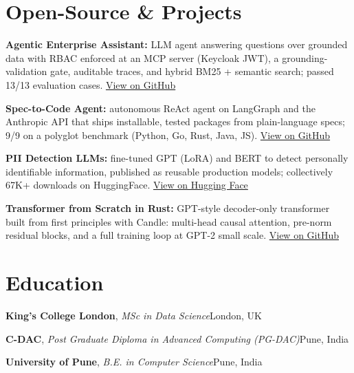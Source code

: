 \documentclass[10pt,a4paper]{article}
\begin{document}
\section{Open-Source \& Projects}
\begin{tight}
  \item \textbf{Agentic Enterprise Assistant:} LLM agent answering questions over grounded data with RBAC enforced at an MCP server (Keycloak JWT), a grounding-validation gate, auditable traces, and hybrid BM25 + semantic search; passed 13/13 evaluation cases. \href{https://github.com/abhijeetscode/Agentic-Enterprise-Assistant}{View on GitHub}
  \item \textbf{Spec-to-Code Agent:} autonomous ReAct agent on LangGraph and the Anthropic API that ships installable, tested packages from plain-language specs; 9/9 on a polyglot benchmark (Python, Go, Rust, Java, JS). \href{https://github.com/abhijeetscode/Spec-to-Code-Agent}{View on GitHub}
  \item \textbf{PII Detection LLMs:} fine-tuned GPT (LoRA) and BERT to detect personally identifiable information, published as reusable production models; collectively 67K+ downloads on HuggingFace. \href{https://huggingface.co/ab-ai/pii_model}{View on Hugging Face}
  \item \textbf{Transformer from Scratch in Rust:} GPT-style decoder-only transformer built from first principles with Candle: multi-head causal attention, pre-norm residual blocks, and a full training loop at GPT-2 small scale. \href{https://github.com/abhijeetscode/transformer-rust}{View on GitHub}
\end{tight}

\section{Education}
{\color{company}\bfseries King's College London}, {\itshape MSc in Data Science}\hfill {\color{muted}London, UK}\par\vspace{2pt}
{\color{company}\bfseries C-DAC}, {\itshape Post Graduate Diploma in Advanced Computing (PG-DAC)}\hfill {\color{muted}Pune, India}\par\vspace{2pt}
{\color{company}\bfseries University of Pune}, {\itshape B.E. in Computer Science}\hfill {\color{muted}Pune, India}\par
\end{document}
